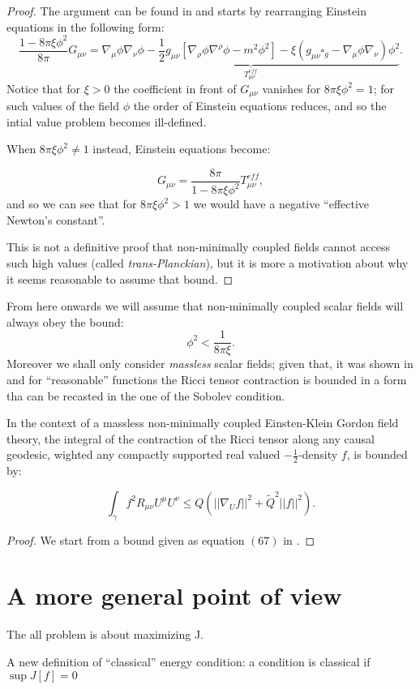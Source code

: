 \begin{proof}
    The argument can be found in \cite*{kontou2020energy} and starts by rearranging Einstein equations in the following form:
    \[
      \frac{1 - 8\pi\xi\phi^2}{8\pi}G_{\mu\nu} =  \underbrace{\nabla_{\mu}\phi\nabla_{\nu}\phi - \frac{1}{2}g_{\mu\nu}\left[\nabla_{\rho}\phi\nabla^{\rho}\phi - m^2\phi^2\right] - \xi\left(g_{\mu\nu}\square_g - \nabla_{\mu}\phi\nabla_{\nu}\right)\phi^2}_{T^{eff}_{\mu\nu}}.
    \]
    Notice that for \(\xi > 0\) the coefficient in front of \(G_{\mu\nu}\) vanishes for \(8\pi\xi\phi^2 = 1\); for such values of the field \(\phi\) the order of Einstein equations reduces, and so the intial value problem becomes ill-defined.

    When \(8\pi\xi\phi^2 \neq 1\) instead, Einstein equations become:

    \[
        G_{\mu\nu} = \frac{8\pi}{1 - 8\pi\xi\phi^2}T^{eff}_{\mu\nu},
    \]
    and so we can see that for \(8\pi\xi\phi^2 > 1\) we would have a negative ``effective Newton's constant''. 

    This is not a definitive proof that non-minimally coupled fields cannot access such high values (called \emph{trans-Planckian}), but it is more a motivation about why it seems reasonable to assume that bound. 
\end{proof}

From here onwards we will assume that non-minimally coupled scalar fields will always obey the bound:
\[
\phi^2 < \frac{1}{8\pi\xi}.    
\]
Moreover we shall only consider \emph{massless} scalar fields; given that, it was shown in \cite{fewster2011singularity} and \cite{brown2018singularity} for ``reasonable'' functions the Ricci tensor contraction is bounded in a form tha can be recasted in the one of the Sobolev condition.

\begin{prop}
    In the context of a massless non-minimally coupled Einsten-Klein Gordon field theory, the integral of the contraction of the Ricci tensor along any causal geodesic, wighted any compactly supported real valued \(-\frac{1}{2}\)-density \(f\), is bounded by:

    \begin{equation}
        \int_{\gamma}f^2 R_{\mu\nu}U^{\mu}U^{\nu} \le Q\left(\vert\vert\nabla_U f \vert\vert^2 + \tilde{Q}^2 \vert\vert f\vert\vert^2\right).
    \end{equation}
\end{prop}

\begin{proof}
    We start from a bound given as equation \((67)\) in \cite{brown2018singularity}.
\end{proof}



\section{A more general point of view}

The all problem is about maximizing J. %

A new definition of ``classical'' energy condition: a condition is classical if \(\sup J[f] = 0\)
	
	
	
	
	
	

	
	
	
	
	



